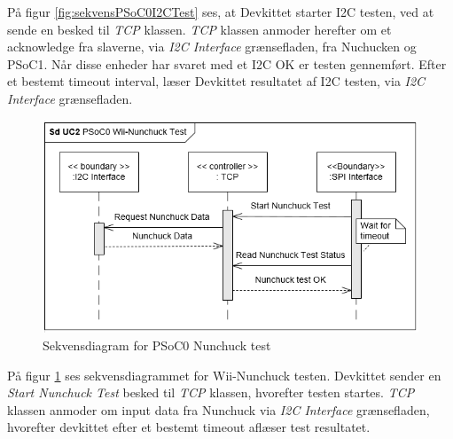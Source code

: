 På figur \ref{fig:sekvensPSoC0I2CTest} ses, at Devkittet starter I2C testen, ved at sende en besked til \textit{TCP} klassen. \textit{TCP} klassen anmoder herefter om et acknowledge fra slaverne, via \textit{I2C Interface} grænsefladen, fra Nuchucken og PSoC1. Når disse enheder har svaret med et I2C OK er testen gennemført. Efter et bestemt timeout interval, læser Devkittet resultatet af I2C testen, via \textit{I2C Interface} grænsefladen.

\begin{figure}[H]
	\centering
	\includegraphics[width=\textwidth] {Systemarkitektur/images/SDPSoC0NunchuckTest}
	\caption{Sekvensdiagram for PSoC0 Nunchuck test}
	\label{fig:sekvensPSoC0NunchuckTest}
\end{figure}

På figur \ref{fig:sekvensPSoC0NunchuckTest} ses sekvensdiagrammet for Wii-Nunchuck testen. Devkittet sender en \textit{Start Nunchuck Test} besked til \textit{TCP} klassen, hvorefter testen startes. \textit{TCP} klassen anmoder om input data fra Nunchuck via \textit{I2C Interface} grænsefladen, hvorefter devkittet efter et bestemt timeout aflæser test resultatet.

